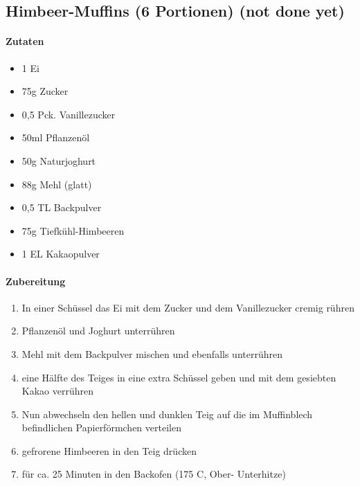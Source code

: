 \newpage
\subsection{Himbeer-Muffins (6 Portionen) (not done yet)}
\paragraph{Zutaten}
\begin{itemize}[noitemsep]
	\item 1 Ei
	\item 75g Zucker
	\item 0,5 Pck. Vanillezucker 
	\item 50ml Pflanzenöl
	\item 50g Naturjoghurt
	\item 88g Mehl (glatt)
	\item 0,5 TL Backpulver
	\item 75g Tiefkühl-Himbeeren 
	\item 1 EL Kakaopulver
\end{itemize}
\paragraph{Zubereitung}
\begin{enumerate}[noitemsep]
	\item In einer Schüssel das Ei mit dem Zucker und dem Vanillezucker cremig rühren 
	\item Pflanzenöl und Joghurt unterrühren 
	\item Mehl mit dem Backpulver mischen und ebenfalls unterrühren
	\item eine Hälfte des Teiges in eine extra Schüssel geben und mit dem gesiebten Kakao verrühren
	\item Nun abwechseln den hellen und dunklen Teig auf die im Muffinblech befindlichen Papierförmchen verteilen
	\item gefrorene Himbeeren in den Teig drücken
	\item für ca. 25 Minuten in den Backofen (175 \textdegree C, Ober- Unterhitze)
\end{enumerate}